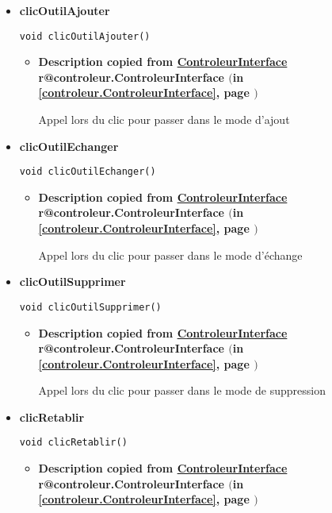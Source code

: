 \documentclass[11pt,a4paper]{report}
\makeatletter
\newcommand{\refdefined}[1]{
\expandafter\ifx\csname r@#1\endcsname\relax
\relax\else
{$($in \ref{#1}, page \pageref{#1}$)$}\fi}
\makeatother
\begin{document}
{{{{{\begin{itemize}
{\begin{itemize}
{Appel lors du clic droit
}
\end{itemize}
}%
\item{ 
\hypertarget{controleur.Controleur.clicOutilAjouter()}{{\bf  clicOutilAjouter}\\}
\begin{lstlisting}[frame=none]
void clicOutilAjouter()\end{lstlisting} %
\begin{itemize}
\item{
{\bf  Description copied from \hyperlink{controleur.ControleurInterface}{ControleurInterface}{\small \refdefined{controleur.ControleurInterface}} }

Appel lors du clic pour passer dans le mode d'ajout
}
\end{itemize}
}%
\item{ 
\hypertarget{controleur.Controleur.clicOutilEchanger()}{{\bf  clicOutilEchanger}\\}
\begin{lstlisting}[frame=none]
void clicOutilEchanger()\end{lstlisting} %
\begin{itemize}
\item{
{\bf  Description copied from \hyperlink{controleur.ControleurInterface}{ControleurInterface}{\small \refdefined{controleur.ControleurInterface}} }

Appel lors du clic pour passer dans le mode d'échange
}
\end{itemize}
}%
\item{ 
\hypertarget{controleur.Controleur.clicOutilSupprimer()}{{\bf  clicOutilSupprimer}\\}
\begin{lstlisting}[frame=none]
void clicOutilSupprimer()\end{lstlisting} %
\begin{itemize}
\item{
{\bf  Description copied from \hyperlink{controleur.ControleurInterface}{ControleurInterface}{\small \refdefined{controleur.ControleurInterface}} }

Appel lors du clic pour passer dans le mode de suppression
}
\end{itemize}
}%
\item{ 
\hypertarget{controleur.Controleur.clicRetablir()}{{\bf  clicRetablir}\\}
\begin{lstlisting}[frame=none]
void clicRetablir()\end{lstlisting} %
\begin{itemize}
\item{
{\bf  Description copied from \hyperlink{controleur.ControleurInterface}{ControleurInterface}{\small \refdefined{controleur.ControleurInterface}} }

}
\end{itemize}}
\end{itemize}}}}}}
\end{document}

